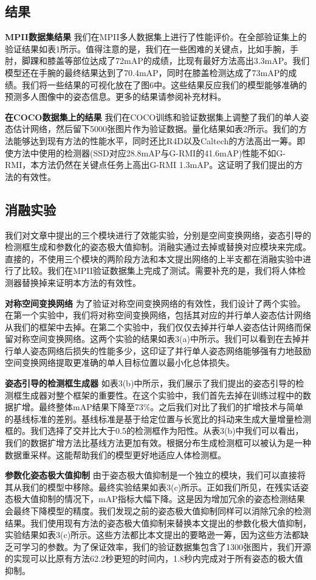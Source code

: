 \subsection*{结果}
\textbf{MPII数据集结果} 我们在MPII多人数据集上进行了性能评价。在全部验证集上的验证结果如表1所示。值得注意的是，我们在一些困难的关键点，比如手腕，手肘，脚踝和膝盖等部位达成了72mAP的成绩，比现有最好方法高出3.3mAP。我们模型还在手腕的最终结果达到了70.4mAP，同时在膝盖检测达成了73mAP的成绩。我们将一些结果的可视化放在了图6中。这些结果反应我们的模型能够准确的预测多人图像中的姿态信息。更多的结果请参阅补充材料。

\textbf{在COCO数据集上的结果} 我们在COCO训练和验证数据集上调整了我们的单人姿态估计网络，然后留下5000张图片作为验证数据。量化结果如表2所示。我们的方法能够达到现有方法的性能水平，同时还比R4D以及Caltech的方法高出一筹。即使方法中使用的检测器(SSD对应28.8mAP与G-RMI的41.6mAP)性能不如G-RMI，本方法仍然在关键点任务上高出G-RMI 1.3mAP。这证明了我们提出的方法的有效性。

\subsection*{消融实验}
我们对文章中提出的三个模块进行了效能实验，分别是空间变换网络，姿态引导的检测框生成和参数化的姿态极大值抑制。消融实通过去掉或替换对应模块来完成。直接的，不使用三个模块的两阶段方法和本文提出网络的上半支都在消融实验中进行了比较。我们在MPII验证数据集上完成了测试。需要补充的是，我们将人体检测器替换掉来证明本方法的有效性。

\textbf{对称空间变换网络} 为了验证对称空间变换网络的有效性，我们设计了两个实验。在第一个实验中，我们将对称空间变换网络，包括其对应的并行单人姿态估计网络从我们的框架中去掉。在第二个实验中，我们仅仅去掉并行单人姿态估计网络而保留对称空间变换网络。这两个实验的结果如表3(a)中所示。我们可以看到在去掉并行单人姿态网络后损失的性能多少，这印证了并行单人姿态网络能够强有力地鼓励空间变换网络提取更准确的单人目标位置以最小化总体损失。

\textbf{姿态引导的检测框生成器} 如表3(b)中所示，我们展示了我们提出的姿态引导的检测框生成器对整个框架的重要性。在这个实验中，我们首先去掉在训练过程中的数据扩增。最终整体mAP结果下降至73\%。之后我们对比了我们的扩增技术与简单的基线标准的差别。基线标准是基于给定位置与长宽比的抖动来生成大量增量检测框的。我们选择了交并比大于0.5的检测框作为阳性。从表3(b)中我们可以看出，我们的数据扩增方法比基线方法更加有效。根据分布生成检测框可以被认为是一种数据重采样。这能帮助我们的模型更好地适应人体检测框。

\textbf{参数化姿态极大值抑制} 由于姿态极大值抑制是一个独立的模块，我们可以直接将其从我们的模型中移除。最终实验结果如表3(c)所示。正如我们所见，在残实话姿态极大值抑制的情况下，mAP指标大幅下降。这是因为增加冗余的姿态检测结果会最终下降模型的精度。我们发现之前的姿态极大值抑制同样可以消除冗余的检测结果。我们使用现有方法的姿态极大值抑制来替换本文提出的参数化极大值抑制，实验结果如表3(c)所示。这些方法都比本文提出的要略逊一筹，因为这些方法都缺乏可学习的参数。为了保证效率，我们的验证数据集包含了1300张图片，我们开源的实现可以比原有方法62.2秒更短的时间内，1.8秒内完成对于所有姿态的极大值抑制。

